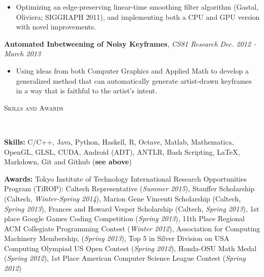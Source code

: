 \documentclass[9pt]{article}
\newenvironment{changemargin}[2]{%
  \begin{list}{}{%
    \setlength{\topsep}{0pt}%
    \setlength{\leftmargin}{#1}%
    \setlength{\rightmargin}{#2}%
    \setlength{\listparindent}{\parindent}%
    \setlength{\itemindent}{\parindent}%
    \setlength{\parsep}{\parskip}%
  }%
  \item[]}{\end{list}
}
\newcommand{\lineover}{
	\begin{changemargin}{-0.05in}{-0.05in}
		\vspace*{-8pt}
		\hrulefill \\
		\vspace*{-2pt}
	\end{changemargin}
}
\newcommand{\header}[1]{
	\begin{changemargin}{-0.5in}{-0.5in}
		\scshape{#1}\\
  	\lineover
	\end{changemargin}
}
\newenvironment{body} {
	\vspace*{-16pt}
	\begin{changemargin}{-0.25in}{-0.5in}
  }	
	{\end{changemargin}
}
\begin{document}
\begin{body}
		\vspace*{-3pt}
	\begin{itemize} \itemsep -0pt
		\item Optimizing an edge-preserving linear-time smoothing filter algorithm (Gastal, Oliviera; SIGGRAPH 2011), and implementing both a CPU and GPU version with novel improvements.
	\end{itemize}
		\vspace*{-3pt}
	\textbf{Automated Inbetweening of Noisy Keyframes}, \emph{CS81 Research} \hfill \emph{Dec. 2012 - March 2013} \\
		\vspace*{-3pt}
	\begin{itemize} \itemsep -0pt
		\item Using ideas from both Computer Graphics and Applied Math to develop a generalized method that can automatically generate artist-drawn keyframes in a way that is faithful to the artist's intent.
	\end{itemize}

\end{body}

\smallskip

\header{Skills and Awards}
\smallskip
\begin{body}
	\vspace{18pt}
	
	\textbf{Skills:} C/C++, Java, Python, Haskell, R, Octave, Matlab, Mathematica, OpenGL, GLSL, CUDA, Android (ADT), ANTLR, Bash Scripting, \LaTeX, Markdown, Git and Github (\textbf{see above})\\
	
	\medskip
	
	\textbf{Awards:} Tokyo Institute of Technology International Research Opportunities Program (TiROP): Caltech Representative (\emph{Summer 2015}), Stauffer Scholarship (Caltech, \emph{Winter-Spring 2014}), Marion Gene Vincenti Scholarship (Caltech, \emph{Spring 2013}),
        Frances and Howard Vesper Scholarship (Caltech, \emph{Spring 2013}),
        1st place Google Games Coding Competition (\emph{Spring 2013}),
        11th Place Regional ACM Collegiate Programming Contest (\emph{Winter 2012}),
        Association for Computing Machinery Membership, (\emph{Spring 2013}),
        Top 5 in Silver Division on USA Computing Olympiad US Open Contest (\emph{Spring 2012}),
        Honda-OSU Math Medal (\emph{Spring 2012}),
        1st Place American Computer Science League Contest (\emph{Spring 2012})
	
	
%
\end{body}
\end{document}
